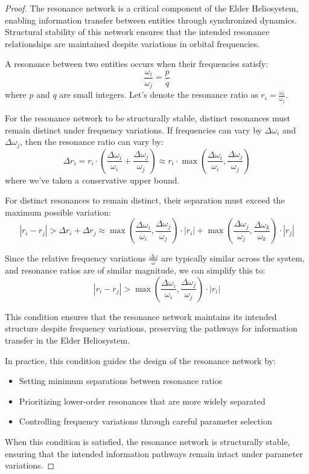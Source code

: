 \begin{proof}
The resonance network is a critical component of the Elder Heliosystem, enabling information transfer between entities through synchronized dynamics. Structural stability of this network ensures that the intended resonance relationships are maintained despite variations in orbital frequencies.

A resonance between two entities occurs when their frequencies satisfy:
\begin{equation}
\frac{\omega_i}{\omega_j} = \frac{p}{q}
\end{equation}
where $p$ and $q$ are small integers. Let's denote the resonance ratio as $r_i = \frac{\omega_i}{\omega_j}$.

For the resonance network to be structurally stable, distinct resonances must remain distinct under frequency variations. If frequencies can vary by $\Delta \omega_i$ and $\Delta \omega_j$, then the resonance ratio can vary by:
\begin{equation}
\Delta r_i = r_i \cdot \left(\frac{\Delta \omega_i}{\omega_i} + \frac{\Delta \omega_j}{\omega_j}\right) \approx r_i \cdot \max\left(\frac{\Delta \omega_i}{\omega_i}, \frac{\Delta \omega_j}{\omega_j}\right)
\end{equation}
where we've taken a conservative upper bound.

For distinct resonances to remain distinct, their separation must exceed the maximum possible variation:
\begin{equation}
|r_i - r_j| > \Delta r_i + \Delta r_j \approx \max\left(\frac{\Delta \omega_i}{\omega_i}, \frac{\Delta \omega_j}{\omega_j}\right) \cdot |r_i| + \max\left(\frac{\Delta \omega_j}{\omega_j}, \frac{\Delta \omega_k}{\omega_k}\right) \cdot |r_j|
\end{equation}

Since the relative frequency variations $\frac{\Delta \omega}{\omega}$ are typically similar across the system, and resonance ratios are of similar magnitude, we can simplify this to:
\begin{equation}
|r_i - r_j| > \max\left(\frac{\Delta \omega_i}{\omega_i}, \frac{\Delta \omega_j}{\omega_j}\right) \cdot |r_i|
\end{equation}

This condition ensures that the resonance network maintains its intended structure despite frequency variations, preserving the pathways for information transfer in the Elder Heliosystem.

In practice, this condition guides the design of the resonance network by:
\begin{itemize}
    \item Setting minimum separations between resonance ratios
    \item Prioritizing lower-order resonances that are more widely separated
    \item Controlling frequency variations through careful parameter selection
\end{itemize}

When this condition is satisfied, the resonance network is structurally stable, ensuring that the intended information pathways remain intact under parameter variations.
\end{proof}

